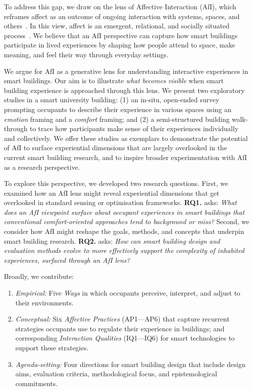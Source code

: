 To address this gap, we draw on the lens of Affective Interaction (AfI), which reframes affect as an outcome of ongoing interaction with systems, spaces, and others~\cite{lottridge2011affective, ahmadpour2025affective, caon2014affective}. In this view, affect is an emergent, relational, and socially situated process~\cite{lottridge2011affective, ahmadpour2025affective, caon2014affective}. We believe that an AfI perspective can capture how smart buildings participate in lived experiences by shaping how people attend to space, make meaning, and feel their way through everyday settings. 

We argue for AfI as a generative lens for understanding interactive experiences in smart buildings. Our aim is to illustrate \emph{what becomes visible} when smart building experience is approached through this lens. We present two exploratory studies in a smart university building: (1) an in-situ, open-ended survey prompting occupants to describe their experience in various spaces using an \textit{emotion} framing and a \textit{comfort} framing; and (2) a semi-structured building walk-through to trace how participants make sense of their experiences individually and collectively. We offer these studies as exemplars to demonstrate the potential of AfI to surface experiential dimensions that are largely overlooked in the current smart building research, and to inspire broader experimentation with AfI as a research perspective.

To explore this perspective, we developed two research questions. First, we examined how an AfI lens might reveal experiential dimensions that get overlooked in standard sensing or optimisation frameworks. \textbf{RQ1.} asks: \textit{What does an AfI viewpoint surface about occupant experiences in smart buildings that conventional comfort-oriented approaches tend to background or miss?} Second, we consider how AfI might reshape the goals, methods, and concepts that underpin smart building research. \textbf{RQ2.} asks: \textit{How can smart building design and evaluation methods evolve to more effectively support the complexity of inhabited experiences, surfaced through an AfI lens?}

Broadly, we contribute:
\begin{enumerate}
    \item \emph{Empirical:} Five \emph{Ways} in which occupants perceive, interpret, and adjust to their environments.
    \item \emph{Conceptual:} Six \textit{Affective Practices} (AP1---AP6) that capture recurrent strategies occupants use to regulate their experience in buildings; and corresponding \textit{Interaction Qualities} (IQ1---IQ6) for smart technologies to support these strategies.
    \item \emph{Agenda-setting:} Four directions for smart building design that include design aims, evaluation criteria, methodological focus, and epistemological commitments. 
\end{enumerate}

